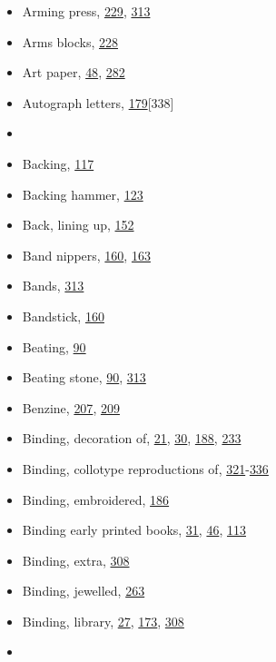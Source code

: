 \documentclass[
]{article}
\providecommand{\tightlist}{%
  \setlength{\itemsep}{0pt}\setlength{\parskip}{0pt}}
\begin{document}
\begin{itemize}
\tightlist
\item
  {Arming press}, \protect\hyperlink{Page_229}{229},
  \protect\hyperlink{Page_313}{313}
\item
  Arms blocks, \protect\hyperlink{Page_228}{228}
\item
  Art paper, \protect\hyperlink{Page_48}{48},
  \protect\hyperlink{Page_282}{282}
\item
  Autograph letters,
  \protect\hyperlink{Page_179}{179}{\protect\hypertarget{Page_338}{}{{[}338{]}}}
\item
  ~
\item
  {Backing}, \protect\hyperlink{Page_117}{117}
\item
  Backing hammer, \protect\hyperlink{Page_123}{123}
\item
  Back, lining up, \protect\hyperlink{Page_152}{152}
\item
  Band nippers, \protect\hyperlink{Page_160}{160},
  \protect\hyperlink{Page_163}{163}
\item
  Bands, \protect\hyperlink{Page_313}{313}
\item
  Bandstick, \protect\hyperlink{Page_160}{160}
\item
  Beating, \protect\hyperlink{Page_90}{90}
\item
  Beating stone, \protect\hyperlink{Page_90}{90},
  \protect\hyperlink{Page_313}{313}
\item
  Benzine, \protect\hyperlink{Page_207}{207},
  \protect\hyperlink{Page_209}{209}
\item
  Binding, decoration of, \protect\hyperlink{Page_21}{21},
  \protect\hyperlink{Page_30}{30}, \protect\hyperlink{Page_188}{188},
  \protect\hyperlink{Page_233}{233}
\item
  Binding, collotype reproductions of,
  \protect\hyperlink{Page_321}{321}-\protect\hyperlink{Page_336}{336}
\item
  Binding, embroidered, \protect\hyperlink{Page_186}{186}
\item
  Binding early printed books, \protect\hyperlink{Page_31}{31},
  \protect\hyperlink{Page_46}{46}, \protect\hyperlink{Page_113}{113}
\item
  Binding, extra, \protect\hyperlink{Page_308}{308}
\item
  Binding, jewelled, \protect\hyperlink{Page_263}{263}
\item
  Binding, library, \protect\hyperlink{Page_27}{27},
  \protect\hyperlink{Page_173}{173}, \protect\hyperlink{Page_308}{308}
\item

\end{itemize}
\end{document}
